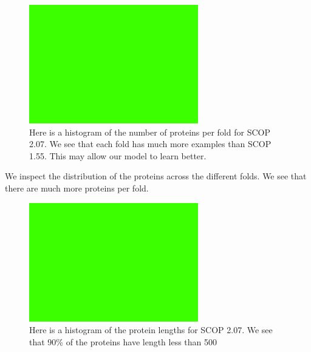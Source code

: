 \documentclass[12pt, a4paper, twocolumn, fullpage]{article}
\theoremstyle{plain}
\theoremstyle{definition}
\theoremstyle{remark}
\begin{document}
\begin{figure}[t]
    \includegraphics[width=\linewidth]{img/blank.png}
    \caption{Here is a histogram of the number of proteins per fold for SCOP 2.07. We see that each fold has much more examples than SCOP 1.55. This may allow our model to learn better.}
    \label{numproteinfold2.07}
\end{figure}

We inspect the distribution of the proteins across the different folds. We see that there are much more proteins per fold.

\begin{figure}[t]
    \includegraphics[width=\linewidth]{img/blank.png}
    \caption{Here is a histogram of the protein lengths for SCOP 2.07. We see that 90\% of the proteins have length less than 500}
    \label{chainlength2.07}
\end{figure}
\end{document}
